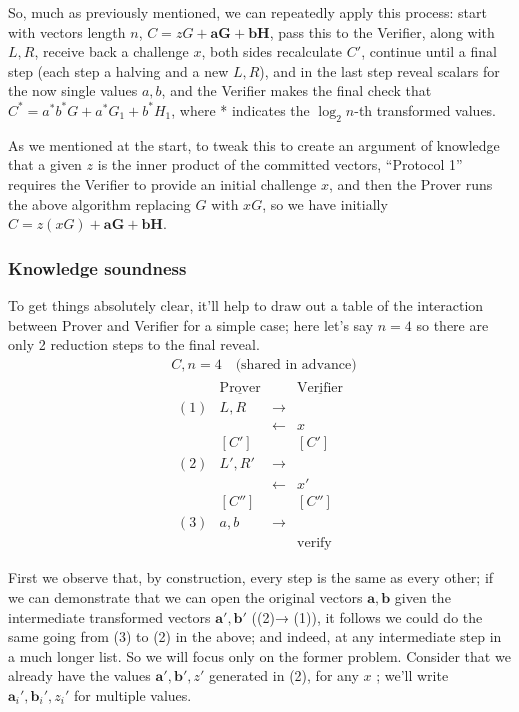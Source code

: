 \documentclass[10pt,a4paper]{article}
\begin{document}
So, much as previously mentioned, we can repeatedly apply this process:
start with vectors length $n$, $C = zG + \textbf{aG} + \textbf{bH}$, pass this to the Verifier, along with $L,R$,
receive back a challenge $x$, both sides recalculate $C'$, continue until a
final step (each step a halving and a new $L, R$), and in the last step reveal
scalars for the now single values $a, b$, and the Verifier makes the final
check that $C^{*} = a^{*}b^{*}G + a^{*}G_1 + b^{*}H_1$, where * indicates the $\log_2n$-th transformed values.

As we mentioned at the start, to tweak this to create an argument of
knowledge that a given $z$ is the inner product of the committed vectors,
``Protocol 1'' requires the Verifier to provide an initial challenge $x$,
and then the Prover runs the above algorithm replacing $G$ with $xG$, so we have
initially $C = z(xG) + \textbf{aG} + \textbf{bH}$.

\hypertarget{knowledge-soundness-1}{%
\subsubsection[Knowledge
soundness]{\texorpdfstring{\protect\hypertarget{anchor-52}{}{}Knowledge
soundness}{Knowledge soundness}}\label{knowledge-soundness-1}}

To get things absolutely clear, it'll help to draw out a table of the
interaction between Prover and Verifier for a simple case; here let's
say $n=4$ so there are only 2 reduction steps to the final reveal.
\begin{align*}
&C, n=4 \quad \textrm{(shared in advance)}  \\
& \begin{matrix} 
& \underline{\textrm{Prover}} &  &\underline{\textrm{Verifier}}  &\\
(1) &  L, R & \rightarrow & &\\
 & & \leftarrow & x & \\
  & [C'] & & [C'] & \\
 (2) & L', R' & \rightarrow & & \\
 & & \leftarrow & x' & \\
 & [C''] & & [C''] & \\
(3) & a, b & \rightarrow & & \\
 & & & \textrm{verify} & \\
\end{matrix} \\
\end{align*}
First we observe that, by construction, every step is the same as every
other; if we can demonstrate that we can open the original vectors $\mathbf{a}, \mathbf{b}$ given
the intermediate transformed vectors $\mathbf{a}', \mathbf{b}'$ ((2)→ (1)), it follows we could do
the same going from (3) to (2) in the above; and indeed, at any
intermediate step in a much longer list. So we will focus only on the
former problem. Consider that we already have the values $\mathbf{a}', \mathbf{b}', z'$ generated in
(2), for any $x$ ; we'll write $\textbf{a}_i', \textbf{b}_i', z_i'$ for multiple values.
\end{document}

